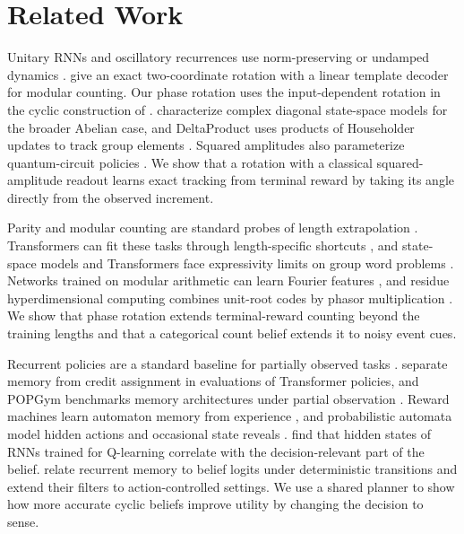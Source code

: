 \section{Related Work}\label{sec:related}

Unitary RNNs and oscillatory recurrences use norm-preserving or undamped
dynamics \citep{arjovsky2016urnn,rusch2021cornn}. \citet{grazzi2025negative} give
an exact two-coordinate rotation with a linear template decoder for modular
counting. Our phase rotation uses the input-dependent rotation in the cyclic
construction of \citet{karuvally2025aussm}. \citet{shakerinava2026diagonal}
characterize complex diagonal state-space models for the broader Abelian case,
and DeltaProduct uses products of Householder updates to track group elements
\citep{siems2025deltaproduct}. Squared amplitudes also parameterize
quantum-circuit policies \citep{jerbi2021parametrized}. We show that a rotation
with a classical squared-amplitude readout learns exact tracking from terminal
reward by taking its angle directly from the observed increment.

Parity and modular counting are standard probes of length extrapolation
\citep{deletang2023chomsky}. Transformers can fit these tasks through
length-specific shortcuts \citep{liu2023shortcuts,zhou2024rasp}, and state-space
models and Transformers face expressivity limits on group word problems
\citep{merrill2024illusion}. Networks trained on modular arithmetic can learn
Fourier features \citep{nanda2023grokking,chughtai2023universality,zhong2023clock},
and residue hyperdimensional computing combines unit-root codes by phasor
multiplication \citep{kymn2025residue}. We show that phase rotation extends
terminal-reward counting beyond the training lengths and that a categorical
count belief extends it to noisy event cues.

Recurrent policies are a standard baseline for partially observed tasks
\citep{hausknecht2015drqn,ni2022recurrent}. \citet{ni2023transformers} separate
memory from credit assignment in evaluations of Transformer policies, and
POPGym benchmarks memory architectures under partial observation
\citep{morad2023popgym}. Reward machines learn automaton memory from experience
\citep{icarte2019reward}, and probabilistic automata model hidden actions and
occasional state reveals \citep{siems2026code}. \citet{lambrechts2022recurrent}
find that hidden states of RNNs trained for Q-learning correlate with the
decision-relevant part of the belief. \citet{zhao2026belief} relate recurrent
memory to belief logits under deterministic transitions and extend their filters
to action-controlled settings. We use a shared planner to show how more
accurate cyclic beliefs improve utility by changing the decision to sense.

